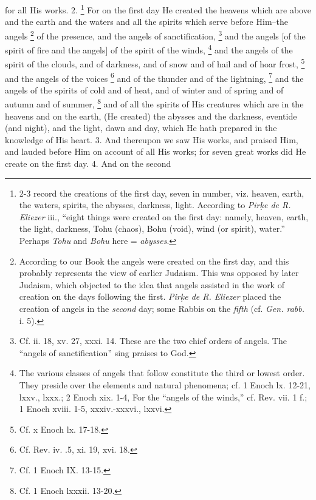 for all His works. 2. \footnote{2-3 record the creations of the first day, seven in number, viz. heaven, earth, the waters, spirits, the abysses, darkness, light. According to \emph{Pir\d{k}e de R. Eliezer} iii., ``eight things were created on the first day: namely, heaven, earth, the light, darkness, Tohu (chaos), Bohu (void), wind (or spirit), water.'' Perhaps \emph{Tohu} and \emph{Bohu} here = \emph{abysses}.} For on the first day He created the heavens which are above and the earth and the waters and all the spirits which serve before Him--the angels \footnote{According to our Book the angels were created on the first day, and this probably represents the view of earlier Judaism. This was opposed by later Judaism, which objected to the idea that angels assisted in the work of creation on the days following the first. \emph{Pir\d{k}e de R. Eliezer} placed the creation of angels in the \emph{second} day; some Rabbis on the \emph{fifth} (cf. \emph{Gen. rabb.} i. 5).} of the presence, and the angels of sanctification, \footnote{Cf. ii. 18, xv. 27, xxxi. 14. These are the two chief orders of angels. The ``angels of sanctification'' sing praises to God.} and the angels [of the spirit of fire and the angels] of the spirit of the winds, \footnote{The various classes of angels that follow constitute the third or lowest order. They preside over the elements and natural phenomena; cf. 1 Enoch lx. 12-21, lxxv., lxxx.; 2 Enoch xix. 1-4, For the ``angels of the winds,'' cf. Rev. vii. 1 f.; 1 Enoch xviii. 1-5, xxxiv.-xxxvi., lxxvi.} and the angels of the spirit of the clouds, and of darkness, and of snow and of hail and of hoar frost, \footnote{Cf. x Enoch lx. 17-18.} and the angels of the voices \footnote{Cf. Rev. iv. .5, xi. 19, xvi. 18.} and of the thunder and of the lightning, \footnote{Cf. 1 Enoch IX. 13-15.} and the angels of the spirits of cold and of heat, and of winter and of spring and of autumn and of summer, \footnote{Cf. 1 Enoch lxxxii. 13-20.} and of all the spirits of His creatures which are in the heavens and on the earth, (He created) the abysses and the darkness, eventide (and night), and the light, dawn and day, which He hath prepared in the knowledge of His heart. 3. And thereupon we saw His works, and praised Him, and lauded before Him on account of all His works; for seven great works did He create on the first day. 4. And on the second

